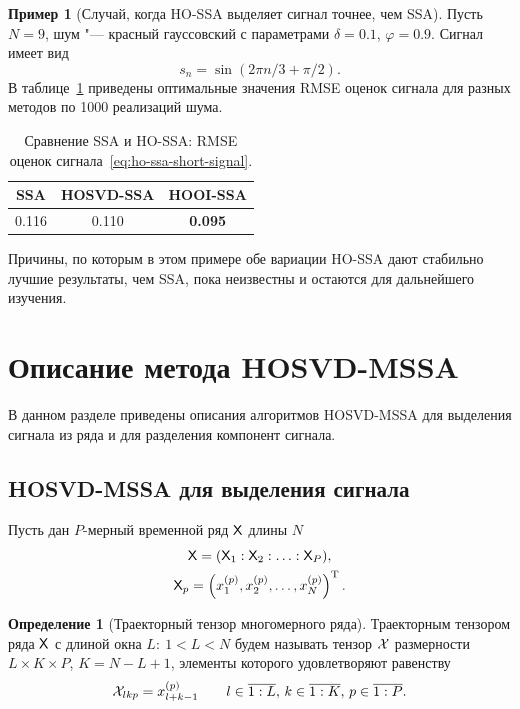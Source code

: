 \documentclass[specialist,
  substylefile=spbu.rtx,
subf,href,colorlinks=true, 12pt]{disser}
\theoremstyle{plain}
\theoremstyle{definition}
\newtheorem{definition}{Определение}[section]
\newtheorem{example}{Пример}[section]
\theoremstyle{remark}
\begin{document}
\begin{example}[Случай, когда HO-SSA выделяет сигнал точнее, чем SSA]
  Пусть $N = 9$, шум "--- красный гауссовский с параметрами $\delta = 0.1$, $\varphi = 0.9$.
  Сигнал имеет вид
  \begin{equation}
    \label{eq:ho-ssa-short-signal}
    s_n = \sin(2\pi n/3 + \pi /2).
  \end{equation}
  В таблице~\ref{tab:tssa-better-ssa} приведены оптимальные значения RMSE оценок сигнала для разных методов
  по 1000 реализаций шума.
  \begin{table}[!ht]
    \centering
    \caption{Сравнение SSA и HO-SSA: RMSE оценок сигнала~\eqref{eq:ho-ssa-short-signal}.}
    \begin{tabular}{ccc}
      \hline
      SSA   & HOSVD-SSA & HOOI-SSA       \\
      \hline
      0.116 & 0.110     & \textbf{0.095} \\
      \hline
    \end{tabular}\label{tab:tssa-better-ssa}
  \end{table}

  Причины, по которым в этом примере обе вариации HO-SSA дают стабильно лучшие результаты, чем SSA, пока неизвестны
  и остаются для дальнейшего изучения.
\end{example}


\section{Описание метода HOSVD-MSSA}\label{sec:Tensor-MSSA-method-description}
В данном разделе приведены описания алгоритмов HOSVD-MSSA для выделения сигнала из ряда и для разделения компонент сигнала.
\subsection{HOSVD-MSSA для выделения сигнала}\label{subsec:Tensor-MSSA-method-signal-description}
Пусть дан $P$-мерный временной ряд $\mathsf{X}$ длины $N$
\begin{gather*}
  \mathsf{X} = (\mathsf{X}_1: \mathsf{X}_2: \ldots: \mathsf{X}_P), \\
  \mathsf{X}_p = \left(x_1^{(p)}, x_2^{(p)}, \ldots, x_N^{(p)}\right)^{\mathrm{T}}.
\end{gather*}

\begin{definition}[Траекторный тензор многомерного ряда]
  \label{def:trajectory-tensor-mssa}
  Траекторным тензором ряда $\mathsf{X}$ с длиной окна $L:\: 1< L < N$ будем называть тензор $\mathcal{X}$
  размерности ${L \times K \times P}$, ${K = N - L + 1}$, элементы которого удовлетворяют равенству
  \[
    \mathcal{X}_{lkp}=x_{l+k-1}^{(p)} \qquad l \in \overline{1:L},\, k \in \overline{1:K},\, p \in \overline{1:P}.
  \]
\end{definition}
\end{document}
